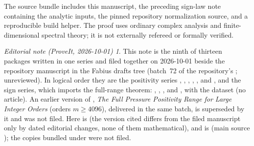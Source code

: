 \documentclass[11pt,a4paper]{article}
\theoremstyle{remark}\newtheorem*{ednote}{Editorial note (ProveIt, 2026-10-01)}
\begin{document}
The source bundle includes this manuscript, the preceding sign-law note containing the analytic inputs, the pinned repository normalization source, and a reproducible build helper. The proof uses ordinary complex analysis and finite-dimensional spectral theory; it is not externally refereed or formally verified.

\begin{ednote}
This note is the ninth of thirteen packages written in one series and filed together on 2026-10-01 beside the repository manuscript  in the Fabius drafts tree (batch~72 of the repository's ; unreviewed). In logical order they are the positivity series , , , , ,  and , and the sign series, which imports the full-range theorem: , , ,  and , with the dataset  (no article). An earlier version of , \emph{The Full Pressure Positivity Range for Large Integer Orders} (orders $m\ge4096$), delivered in the same batch, is superseded by it and was not filed.
Here \cite{Repo} is  (the version cited differs from the filed manuscript only by dated editorial changes, none of them mathematical), and \cite{Signs} is
 (main source ); the copies
bundled under  were not filed.
\end{ednote}
\end{document}
